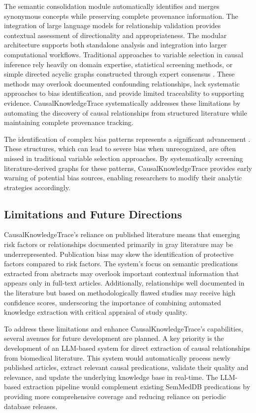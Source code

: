 \documentclass[preprint,12pt,numbers,sort&compress]{elsarticle}
\begin{document}
The semantic consolidation module automatically identifies and merges synonymous concepts while preserving complete provenance information. The integration of large language models for relationship validation provides contextual assessment of directionality and appropriateness. The modular architecture supports both standalone analysis and integration into larger computational workflows. Traditional approaches to variable selection in causal inference rely heavily on domain expertise, statistical screening methods, or simple directed acyclic graphs constructed through expert consensus \cite{vanderweele2019principles, shortreed2017outcome}. These methods may overlook documented confounding relationships, lack systematic approaches to bias identification, and provide limited traceability to supporting evidence. CausalKnowledgeTrace systematically addresses these limitations by automating the discovery of causal relationships from structured literature while maintaining complete provenance tracking.

The identification of complex bias patterns represents a significant advancement \cite{ding2015adjust}. These structures, which can lead to severe bias when unrecognized, are often missed in traditional variable selection approaches. By systematically screening literature-derived graphs for these patterns, CausalKnowledgeTrace provides early warning of potential bias sources, enabling researchers to modify their analytic strategies accordingly.

\subsection{Limitations and Future Directions}

CausalKnowledgeTrace's reliance on published literature means that emerging risk factors or relationships documented primarily in gray literature may be underrepresented. Publication bias \cite{song2010dissemination} may skew the identification of protective factors compared to risk factors. The system's focus on semantic predications extracted from abstracts \cite{kilicoglu2012semmeddb} may overlook important contextual information that appears only in full-text articles. Additionally, relationships well documented in the literature but based on methodologically flawed studies may receive high confidence scores, underscoring the importance of combining automated knowledge extraction with critical appraisal of study quality.

To address these limitations and enhance CausalKnowledgeTrace's capabilities, several avenues for future development are planned. A key priority is the development of an LLM-based system for direct extraction of causal relationships from biomedical literature. This system would automatically process newly published articles, extract relevant causal predications, validate their quality and relevance, and update the underlying knowledge base in real-time. The LLM-based extraction pipeline would complement existing SemMedDB predications by providing more comprehensive coverage and reducing reliance on periodic database releases.
\end{document}
